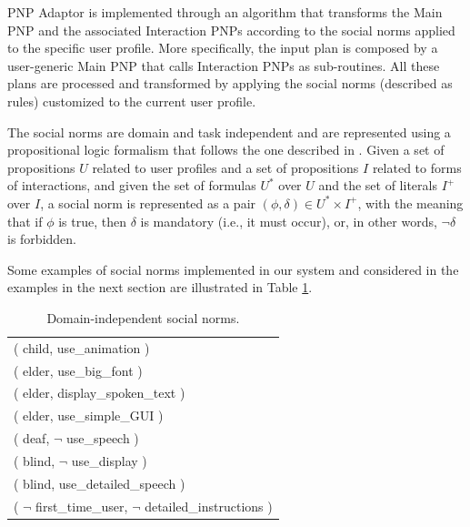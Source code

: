 PNP Adaptor is implemented through an algorithm that transforms the Main PNP and the associated Interaction PNPs according to the social norms applied to the specific user profile. More specifically, the input plan is composed by a user-generic Main PNP that calls Interaction PNPs as sub-routines. All these plans are processed and transformed by applying the social norms (described as rules) customized to the current user profile.

The social norms are domain and task independent and are represented using a propositional logic formalism that follows the one described in \cite{boella2009normative}. 
Given a set of propositions $U$ related to user profiles and a set of propositions $I$ related to forms of interactions, and given the set of formulas $U^{*}$ over $U$ and the set of literals $I^{+}$ over $I$,
a social norm is represented as a pair $(\phi,\delta) \in U^{*} \times I^{+}$, %
with the meaning that if $\phi$ is true, then $\delta$ is mandatory (i.e., it must occur), or, in other words, $\neg \delta$ is forbidden. 

Some examples of social norms implemented in our system and considered in the examples in the next section are illustrated in Table \ref{tab:socialnorms}. 


\begin{table}
\begin{center}
\begin{tabular}{|l|} \hline
( child, use\_animation ) \\ 
( elder, use\_big\_font ) \\ 
( elder, display\_spoken\_text ) \\ 
( elder, use\_simple\_GUI ) \\
( deaf, $\neg$ use\_speech ) \\
( blind, $\neg$ use\_display ) \\
( blind, use\_detailed\_speech ) \\
( $\neg$ first\_time\_user, $\neg$ detailed\_instructions ) \\ 
\hline
\end{tabular}
\caption{Domain-independent social norms.}
\label{tab:socialnorms}
\end{center}
\vspace{-0.8cm}
\end{table}

